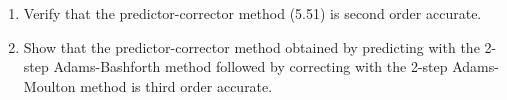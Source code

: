 

\begin{enumerate}
\item 
Verify that the predictor-corrector method (5.51) is second order accurate.

\item Show that the predictor-corrector method obtained by predicting with
the 2-step Adams-Bashforth method followed by correcting with the 2-step
Adams-Moulton method is third order accurate.
\end{enumerate} 

